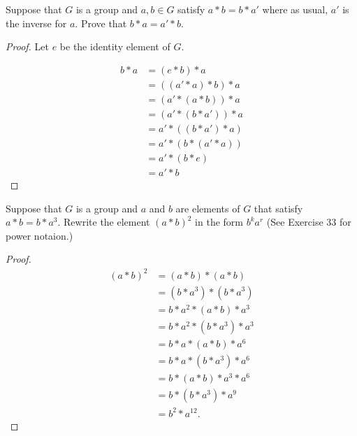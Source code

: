 \newpage
\begin{exercise}
    Suppose that $G$ is a group and $a, b\in G$ satisfy $a * b = b * a'$ where as usual, $a'$ is the inverse for $a$. Prove that $b * a = a' * b$.
\end{exercise}

\begin{proof}
    Let $e$ be the identity element of $G$.

    \begin{align*}
        b * a & = (e * b) * a         \\
              & = ((a' * a) * b) * a  \\
              & = (a' * (a * b)) * a  \\
              & = (a' * (b * a')) * a \\
              & = a' * ((b * a') * a) \\
              & = a' * (b * (a' * a)) \\
              & = a' * (b * e)        \\
              & = a' * b
    \end{align*}
\end{proof}

\newpage
\begin{exercise}
    Suppose that $G$ is a group and $a$ and $b$ are elements of $G$ that satisfy $a * b = b * a^{3}$. Rewrite the element ${(a * b)}^{2}$ in the form $b^{k}a^{r}$ (See Exercise 33 for power notaion.)
\end{exercise}

\begin{proof}
    \begin{align*}
        {(a * b)}^{2} & = (a * b) * (a * b)               \\
                      & = (b * a^{3}) * (b * a^{3})       \\
                      & = b * a^{2} * (a * b) * a^{3}     \\
                      & = b * a^{2} * (b * a^{3}) * a^{3} \\
                      & = b * a * (a * b) * a^{6}         \\
                      & = b * a * (b * a^{3}) * a^{6}     \\
                      & = b * (a * b) * a^{3} * a^{6}     \\
                      & = b * (b * a^{3}) * a^{9}         \\
                      & = b^{2} * a^{12}.
    \end{align*}
\end{proof}

